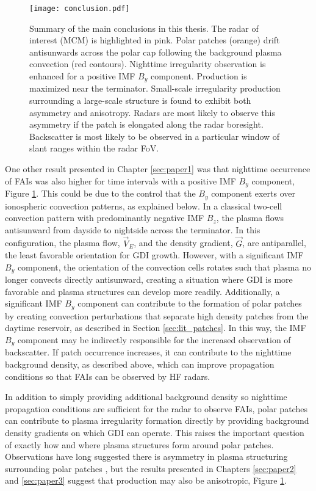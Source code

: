 \begin{figure}
  \texttt{[image: conclusion.pdf]}
  \caption[Irregularity production factors]{Summary of the main conclusions in this thesis.  The radar of interest (MCM) is highlighted in pink.  Polar patches (orange) drift antisunwards across the polar cap following the background plasma convection (red contours).  Nighttime irregularity observation is enhanced for a positive IMF \(B_y\) component.  Production is maximized near the terminator.  Small-scale irregularity production surrounding a large-scale structure is found to exhibit both asymmetry and anisotropy.  Radars are most likely to observe this asymmetry if the patch is elongated along the radar boresight.  Backscatter is most likely to be observed in a particular window of slant ranges within the radar FoV.}
  \label{fig:conclusion}
\end{figure}

One other result presented in Chapter \ref{sec:paper1} was that nighttime occurrence of FAIs was also higher for time intervals with a positive IMF \(B_y\) component, Figure \ref{fig:conclusion}.  This could be due to the control that the \(B_y\) component exerts over ionospheric convection patterns, as explained below.  In a classical two-cell convection pattern with predominantly negative IMF \(B_z\), the plasma flows antisunward from dayside to nightside across the terminator.  In this configuration, the plasma flow, \(\vec{V}_E\), and the density gradient, \(\vec{G}\), are antiparallel, the least favorable orientation for GDI growth.  However, with a significant IMF \(B_y\) component, the orientation of the convection cells rotates such that plasma no longer convects directly antisunward, creating a situation where GDI is more favorable and plasma structures can develop more readily.  Additionally, a significant IMF \(B_y\) component can contribute to the formation of polar patches by creating convection perturbations that separate high density patches from the daytime reservoir, as described in Section \ref{sec:lit_patches}.  In this way, the IMF \(B_y\) component may be indirectly responsible for the increased observation of backscatter.  If patch occurrence increases, it can contribute to the nighttime background density, as described above, which can improve propagation conditions so that FAIs can be observed by 
HF radars.

In addition to simply providing additional background density so nighttime propagation conditions are sufficient for the radar to observe FAIs, polar patches can contribute to plasma irregularity formation directly by providing background density gradients on which GDI can operate.  This raises the important question of exactly how and where plasma structures form around polar patches.  Observations have long suggested there is asymmetry in plasma structuring surrounding polar patches \citep{Weber1984,Milan2002b,Koustov2012}, but the results presented in Chapters \ref{sec:paper2} and \ref{sec:paper3} suggest that production may also be anisotropic, Figure \ref{fig:conclusion}.  

